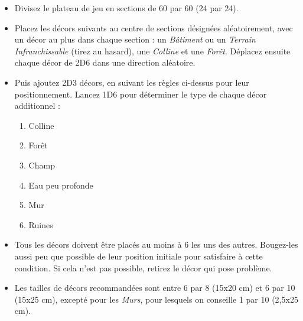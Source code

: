 \begin{itemize}[label={-}]
\item Divisez le plateau de jeu en sections de \unit{60}{\centi\meter} par \unit{60}{\centi\meter} (\unit{24}{\pouce} par \unit{24}{\pouce}).

\item Placez les décors suivants au centre de sections désignées aléatoirement, avec un décor au plus dans chaque section : un \emph{Bâtiment} ou un \emph{Terrain Infranchissable} (tirez au hasard), une \emph{Colline} et une \emph{Forêt}. Déplacez ensuite chaque décor de \unit{2D6}{\pouce} dans une direction aléatoire.

\item Puis ajoutez 2D3 décors, en suivant les règles ci-dessus pour leur positionnement. Lancez 1D6 pour déterminer le type de chaque décor additionnel :
\begin{enumerate}
\item Colline
\item Forêt
\item Champ
\item Eau peu profonde
\item Mur
\item Ruines
\end{enumerate}

\item Tous les décors doivent être placés au moins à \unit{6}{\pouce} les uns des autres. Bougez-les aussi peu que possible de leur position initiale pour satisfaire à cette condition. Si cela n'est pas possible, retirez le décor qui pose problème.
\item Les tailles de décors recommandées sont entre \unit{6}{\pouce} par \unit{8}{\pouce} (15x20 cm) et \unit{6}{\pouce} par \unit{10}{\pouce} (15x25 cm), excepté pour les \emph{Murs}, pour lesquels on conseille \unit{1}{\pouce} par \unit{10}{\pouce} (2,5x25 cm).
\end{itemize}

\section[Type de déploiement]{}

